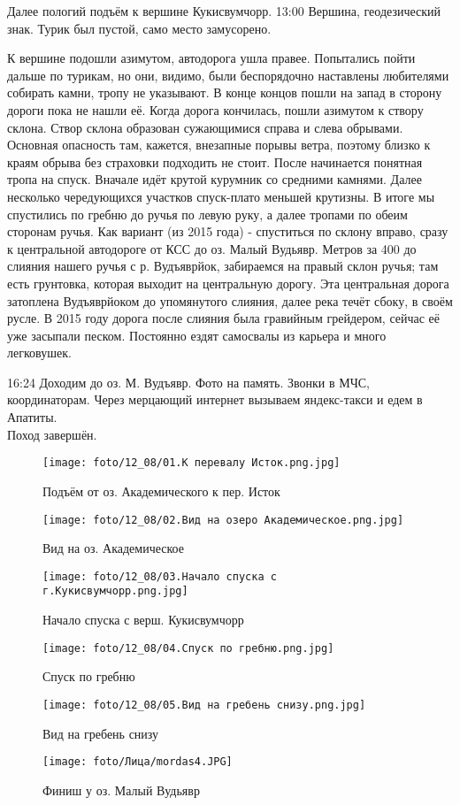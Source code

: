 Далее пологий подъём к вершине Кукисвумчорр.
13:00 Вершина, геодезический знак. Турик был пустой, само место замусорено.

К вершине подошли азимутом, автодорога ушла правее. Попытались пойти дальше по турикам, но они, видимо,
были беспорядочно наставлены любителями собирать камни, тропу не указывают. В конце концов пошли на запад
в сторону дороги пока не нашли её. Когда дорога кончилась, пошли азимутом к створу склона.
Створ склона образован сужающимися справа и слева обрывами. Основная опасность там, кажется, внезапные порывы ветра,
поэтому близко к краям обрыва без страховки подходить не стоит. После  начинается понятная тропа на спуск.
Вначале идёт крутой курумник со средними камнями. Далее несколько чередующихся участков спуск-плато меньшей крутизны.
В итоге мы спустились по гребню до ручья по левую руку, а далее тропами по обеим сторонам ручья.
Как вариант (из 2015 года) - спуститься по склону вправо, сразу к центральной автодороге от КСС до оз. Малый Вудьявр.
Метров за 400 до слияния нашего ручья с р. Вудъяврйок, забираемся на правый склон ручья;
там есть грунтовка, которая выходит на центральную дорогу. Эта центральная дорога затоплена Вудъяврйоком до упомянутого слияния,
далее река течёт сбоку, в своём русле. В 2015 году дорога после слияния была гравийным грейдером,
сейчас её уже засыпали песком. Постоянно ездят самосвалы из карьера и много легковушек.

16:24 Доходим до оз. М. Вудъявр. Фото на память. Звонки в МЧС, координаторам.
Через мерцающий интернет вызываем яндекс-такси и едем в Апатиты.\\
Поход завершён.

\begin{figure}
    \centering
    \texttt{[image: foto/12\_08/01.К перевалу Исток.png.jpg]}
    \caption{Подъём от оз. Академического к пер. Исток}
\end{figure}

\begin{figure}
    \centering
    \texttt{[image: foto/12\_08/02.Вид на озеро Академическое.png.jpg]}
    \caption{Вид на оз. Академическое}
\end{figure}

\begin{figure}
    \centering
    \texttt{[image: foto/12\_08/03.Начало спуска с г.Кукисвумчорр.png.jpg]}
    \caption{Начало спуска с верш. Кукисвумчорр}
\end{figure}

\begin{figure}
    \centering
    \texttt{[image: foto/12\_08/04.Спуск по гребню.png.jpg]}
    \caption{Спуск по гребню}
\end{figure}

\begin{figure}
    \centering
    \texttt{[image: foto/12\_08/05.Вид на гребень снизу.png.jpg]}
    \caption{Вид на гребень снизу}
\end{figure}

\begin{figure}
    \centering
    \texttt{[image: foto/Лица/mordas4.JPG]}
    \caption{Финиш у оз. Малый Вудьявр}
\end{figure}
